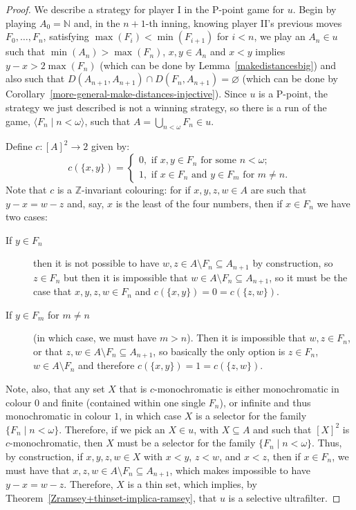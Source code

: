 \documentclass{amsart}
\theoremstyle{definition}
\theoremstyle{remark}
\numberwithin{equation}{section}
\begin{document}
\begin{proof}
    We describe a strategy for player I in the P-point game for $u$.  Begin by playing $A_0=\mathbb N$ and, in the $n+1$-th inning, knowing player II's previous moves $F_0,\ldots,F_n$, satisfying $\max(F_i)<\min(F_{i+1})$ for $i<n$, we play an $A_n\in u$ such that $\min(A_n)>\max(F_n)$, $x,y\in A_n$ and $x<y$ implies $y-x>2\max(F_n)$ (which can be done by Lemma~\ref{makedistancesbig}) and also such that $D(A_{n+1},A_{n+1})\cap D(F_n,A_{n+1})=\varnothing$ (which can be done by Corollary~\ref{more-general-make-distances-injective}). Since $u$ is a P-point, the strategy we just described is not a winning strategy, so there is a run of the game, $\langle F_n\mid n<\omega\rangle$, such that $A=\bigcup_{n<\omega}F_n\in u$.

    Define $c:[A]^2\longrightarrow 2$ given by:
    \begin{equation*}
        c(\{x,y\})=\begin{cases}
            0,\text{ if }x,y\in F_n\text{ for some }n<\omega;\\
            1,\text{ if }x\in F_n\text{ and }y\in F_m\text{ for }m\neq n.
        \end{cases}
    \end{equation*}
    Note that $c$ is a $\mathbb Z$-invariant colouring: for if $x,y,z,w\in A$ are such that $y-x=w-z$ and, say, $x$ is the least of the four numbers, then if $x\in F_n$ we have two cases:
    \begin{description}
        \item[If $y\in F_n$] then it is not possible to have $w,z\in A\setminus F_n\subseteq A_{n+1}$ by construction, so $z\in F_n$ but then it is impossible that $w\in A\setminus F_n\subseteq A_{n+1}$, so it must be the case that $x,y,z,w\in F_n$ and $c(\{x,y\})=0=c(\{z,w\})$.
        \item[If $y\in F_m$ for $m\neq n$] (in which case, we must have $m>n$). Then it is impossible that $w,z\in F_n$, or that $z,w\in A\setminus F_n\subseteq A_{n+1}$, so basically the only option is $z\in F_n$, $w\in A\setminus F_n$ and therefore $c(\{x,y\})=1=c(\{z,w\})$.
    \end{description}
Note, also, that any set $X$ that is $c$-monochromatic is either monochromatic in colour $0$ and finite (contained within one single $F_n$), or infinite and thus monochromatic in colour $1$, in which case $X$ is a selector for the family $\{F_n\mid n<\omega\}$. Therefore, if we pick an $X\in u$, with $X\subseteq A$ and such that $[X]^2$ is $c$-monochromatic, then $X$ must be a selector for the family $\{F_n\mid n<\omega\}$. Thus, by construction, if $x,y,z,w\in X$ with $x<y$, $z<w$, and $x<z$, then if $x\in F_n$, we must have that $x,z,w\in A\setminus F_n\subseteq A_{n+1}$, which makes impossible to have $y-x=w-z$. Therefore, $X$ is a thin set, which implies, by Theorem~\ref{Zramsey+thinset-implica-ramsey}, that $u$ is a selective ultrafilter.
\end{proof}
\end{document}
